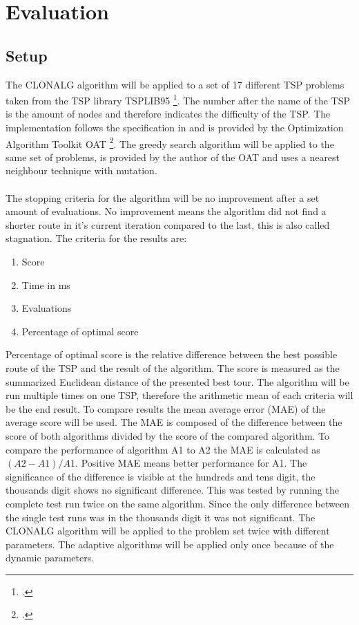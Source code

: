 \chapter{Evaluation}
\label{chap:eva}
\section{Setup}
The CLONALG algorithm will be applied to a set of 17 different TSP problems taken from the TSP library TSPLIB95 \footcite[https://www.iwr.uni-heidelberg.de/groups/comopt/software/TSPLIB95/]{tsplib}. The number after the name of the TSP is the amount of nodes and therefore indicates the difficulty of the TSP. The implementation follows the specification in \cite{DEC02} and is provided by the Optimization Algorithm Toolkit OAT \footcite[http://optalgtoolkit.sourceforge.net/]{oat}. The greedy search algorithm will be applied to the same set of problems, is provided by the author of the OAT and uses a nearest neighbour technique with mutation.\\\\ 
The stopping criteria for the algorithm will be no improvement after a set amount of evaluations. No improvement means the algorithm did not find a shorter route in it's current iteration compared to the last, this is also called stagnation. 
The criteria for the results are:
\begin{enumerate}
	\item 	Score
	\item 	Time in ms
	\item 	Evaluations	
	\item  	Percentage of optimal score
\end{enumerate}
Percentage of optimal score is the relative difference between the best possible route of the TSP and the result of the algorithm. The score is measured as the summarized Euclidean distance of the presented best tour. The algorithm will be run multiple times on one TSP, therefore the arithmetic mean of each criteria will be the end result. To compare results the mean average error (MAE) of the average score will be used. The MAE is composed of the difference between the score of both algorithms divided by the score of the compared algorithm. To compare the performance of algorithm A1 to A2 the MAE is calculated as $(A2-A1)/A1$. Positive MAE means better performance for A1. The significance of the difference is visible at the hundreds and tens digit, the thousands digit shows no significant difference. This was tested by running the complete test run twice on the same algorithm. Since the only difference between the single test runs was in the thousands digit it was not significant. The CLONALG algorithm will be applied to the problem set twice with different parameters. The adaptive algorithms will be applied only once because of the dynamic parameters.
